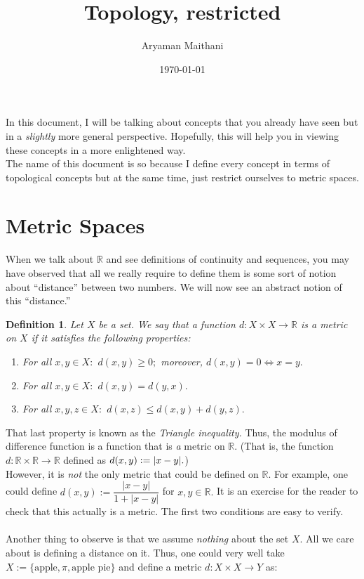 \documentclass[12pt]{article}
\title{Topology, restricted}
\author{Aryaman Maithani}
\date{\today}
\newtheorem{defn}{Definition}
\newcounter{exercise}
\begin{document}
\maketitle
\hrulefill

In this document, I will be talking about concepts that you already have seen but in a \emph{slightly} more general perspective. Hopefully, this will help you in viewing these concepts in a more enlightened way.\\
The name of this document is so because I define every concept in terms of topological concepts but at the same time, just restrict ourselves to metric spaces.\\
\section{Metric Spaces}
	When we talk about $\mathbb{R}$ and see definitions of continuity and sequences, you may have observed that all we really require to define them is some sort of notion about ``distance'' between two numbers. We will now see an abstract notion of this ``distance.''
	\begin{defn}
		Let $X$ be a set. We say that a function $d:X\times X \to \mathbb{R}$ is a \emph{metric} on $X$ if it satisfies the following properties:
		\begin{enumerate} 
			\item For all $x, y \in X:$ $d(x, y) \ge 0;$ moreover, $d(x, y) = 0 \iff x = y.$
			\item For all $x, y \in X:$ $d(x, y) = d(y, x).$
			\item For all $x, y, z \in X:$ $d(x, z) \le d(x, y) + d(y, z).$
		\end{enumerate}
	\end{defn}
	That last property is known as the \emph{Triangle inequality.}
	Thus, the modulus of difference function is a function that is \emph{a} metric on $\mathbb{R}.$ (That is, the function $d : \mathbb{R} \times \mathbb{R} \to \mathbb{R}$ defined as $d(x, y) \vcentcolon= |x - y|.$) \\
	However, it is \emph{not} the only metric that could be defined on $\mathbb{R}.$ For example, one could define $d(x, y) := \dfrac{|x-y|}{1 + |x-y|}$ for $x, y \in \mathbb{R}.$ It is an exercise for the reader to check that this actually is a metric. The first two conditions are easy to verify.\\~\\
	Another thing to observe is that we assume \emph{nothing} about the set $X.$ All we care about is defining a distance on it. Thus, one could very well take $X := \{\text{apple}, \pi, \text{apple pie}\}$ and define a metric $d:X \times X \to Y$ as:
\end{document}
